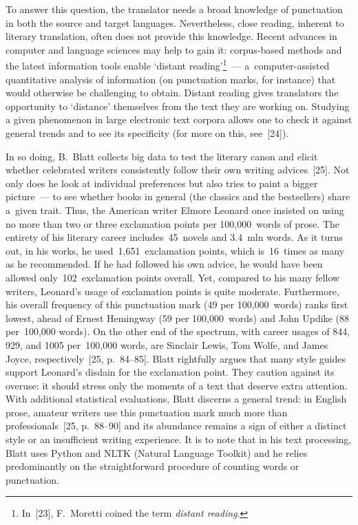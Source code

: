 \begin{multicols}{2}
To answer this question, the translator needs a broad knowledge of punctuation in both the source and target 
languages. Nevertheless, close reading, inherent to literary translation, often does not provide this knowledge. 
Recent advances in computer and language sciences may help to gain it: corpus-based methods and the latest 
information tools enable `distant reading'\footnote[2]{In~[23], F.~Moretti coined the term \textit{distant reading}.}~---
 a~computer-assisted quantitative analysis of information (on punctuation marks, for instance) that 
would otherwise be challenging to obtain. Distant reading gives translators the opportunity to `distance' 
themselves from the text they are working on. Studying a given phenomenon in large electronic text corpora 
allows one to check it against general trends and to see its specificity (for more on this, see~[24]).

    In so doing, B.~Blatt collects big data to test the literary canon and elicit 
whether celebrated writers consistently follow their own writing advices~[25]. Not 
only does he look at individual preferences but also tries to paint a bigger  
picture~--- to see whether books in general (the classics and the bestsellers) share 
a~given trait. Thus, the American writer Elmore Leonard once insisted on using no 
more than two or three exclamation points per 100,000~words of prose. The 
entirety of his literary career includes~45~novels and 3.4~mln words. As it 
turns out, in his works, he used~1,651~exclamation points, which is~16~times as 
many as he recommended. If he had followed his own advice, he would have been 
allowed only~102~exclamation points overall. Yet, compared to his many fellow 
writers, Leonard's usage of exclamation points is quite moderate. Furthermore, his 
overall frequency of this punctuation mark (49 per 100,000~words) ranks first 
lowest, ahead of Ernest Hemingway (59 per 100,000~words) and John Updike (88 
per~100,000 words). On the other end of the spectrum, with career usages  
of 844, 929, and 1005 per~100,000 words, are Sinclair Lewis, Tom Wolfe, and 
James Joyce, respectively~[25, p.~84--85]. Blatt rightfully argues that many style 
guides support Leonard's disdain for the exclamation point. They caution against 
its overuse: it should stress only the moments of a text that deserve extra attention. 
With additional statistical evaluations, Blatt discerns a general trend: in English 
prose, amateur writers use this punctuation mark much more than 
professionals~[25, p.~88--90] and its abundance remains a sign of either a distinct 
style or an insufficient writing experience. It is to note that in his text processing, 
Blatt uses Python and NLTK (Natural Language Toolkit) and he relies 
predominantly on the straightforward procedure of counting words or punctuation.
    

\end{multicols}
